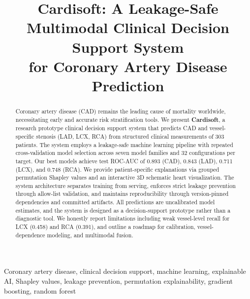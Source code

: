 \documentclass[conference]{IEEEtran}
\begin{document}
\title{Cardisoft: A Leakage-Safe Multimodal Clinical Decision Support System\\for Coronary Artery Disease Prediction}

\author{
\and
{}
}

\maketitle

\begin{abstract}
Coronary artery disease (CAD) remains the leading cause of mortality worldwide, necessitating early and accurate risk stratification tools. We present \textbf{Cardisoft}, a research prototype clinical decision support system that predicts CAD and vessel-specific stenosis (LAD, LCX, RCA) from structured clinical measurements of 303 patients. The system employs a leakage-safe machine learning pipeline with repeated cross-validation model selection across seven model families and 32 configurations per target. Our best models achieve test ROC-AUC of 0.893 (CAD), 0.843 (LAD), 0.711 (LCX), and 0.748 (RCA). We provide patient-specific explanations via grouped permutation Shapley values and an interactive 3D schematic heart visualization. The system architecture separates training from serving, enforces strict leakage prevention through allow-list validation, and maintains reproducibility through version-pinned dependencies and committed artifacts. All predictions are uncalibrated model estimates, and the system is designed as a decision-support prototype rather than a diagnostic tool. We honestly report limitations including weak vessel-level recall for LCX (0.458) and RCA (0.391), and outline a roadmap for calibration, vessel-dependence modeling, and multimodal fusion.
\end{abstract}

\begin{IEEEkeywords}
Coronary artery disease, clinical decision support, machine learning, explainable AI, Shapley values, leakage prevention, permutation explainability, gradient boosting, random forest
\end{IEEEkeywords}
\end{document}
